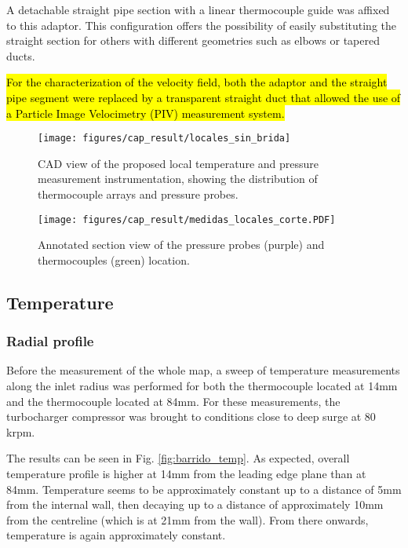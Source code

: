 A detachable straight pipe section with a linear thermocouple guide was affixed to this adaptor. This configuration offers the possibility of easily substituting the straight section for others with different geometries such as elbows or tapered ducts.

\hl{For the characterization of the velocity field, both the adaptor and the straight pipe segment were replaced by a transparent straight duct that allowed the use of a Particle Image Velocimetry (PIV) measurement system.}

\begin{figure}[htb!]
\centering
\texttt{[image: figures/cap\_result/locales\_sin\_brida]}
\caption{CAD view of the proposed local temperature and pressure measurement instrumentation, showing the distribution of thermocouple arrays and pressure probes.}
\label{fig:metod_local_meas}
\end{figure}

\begin{figure}[b!]
\centering
\texttt{[image: figures/cap\_result/medidas\_locales\_corte.PDF]}
\caption{Annotated section view of the pressure probes (purple) and thermocouples (green) location.}
\label{fig:metod_local_meas_dimen}
\end{figure}

\subsection{Temperature}
\label{sub:temperature}

\subsubsection{Radial profile}
Before the measurement of the whole map, a sweep of temperature measurements along the inlet radius was performed for both the thermocouple located at 14mm and the thermocouple located at 84mm. For these measurements, the turbocharger compressor was brought to conditions close to deep surge at 80 krpm.

The results can be seen in Fig. \ref{fig:barrido_temp}. As expected, overall temperature profile is higher at 14mm from the leading edge plane than at 84mm. Temperature seems to be approximately constant up to a distance of 5mm from the internal wall, then decaying up to a distance of approximately 10mm from the centreline (which is at 21mm from the wall). From there onwards, temperature is again approximately constant.

